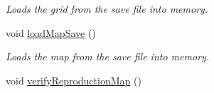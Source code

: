 \begin{DoxyCompactItemize}
\begin{DoxyCompactList}\small\item\em Loads the grid from the save file into memory. \end{DoxyCompactList}\item 
void \hyperlink{class_spatial_tree_a585861bbad04528d2cabf7b1604a40dc}{load\+Map\+Save} ()\hypertarget{class_spatial_tree_a585861bbad04528d2cabf7b1604a40dc}{}\label{class_spatial_tree_a585861bbad04528d2cabf7b1604a40dc}

\begin{DoxyCompactList}\small\item\em Loads the map from the save file into memory. \end{DoxyCompactList}\item 
void \hyperlink{class_spatial_tree_a0eb6f50f218289c79770b203d3eeaada}{verify\+Reproduction\+Map} ()\hypertarget{class_spatial_tree_a0eb6f50f218289c79770b203d3eeaada}{}\label{class_spatial_tree_a0eb6f50f218289c79770b203d3eeaada}


\end{DoxyCompactItemize}
